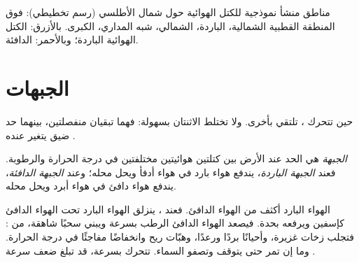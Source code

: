 \begin{omfigure}
{\small مناطق منشأ نموذجية للكتل الهوائية حول شمال  الأطلسي (رسم
تخطيطي): فوق المنطقة القطبية الشمالية،  الباردة،  الشمالي،
 شبه المداري،  الكبرى. بالأزرق: الكتل الهوائية الباردة؛
وبالأحمر: الدافئة.}
\label{fig:g8:fronts-and-weather-maps:sources}
\end{omfigure}

\section{الجبهات}

حين تتحرك ، تلتقي بأخرى. ولا تختلط الاثنتان بسهولة: فهما تبقيان
منفصلتين، بينهما حد ضيق يتغير عنده .

\begin{definition}[الجبهة]\label{def:g8:fronts-and-weather-maps:front}
\emph{الجبهة} هي الحد عند الأرض بين كتلتين هوائيتين مختلفتين في
درجة الحرارة والرطوبة. فعند \emph{الجبهة الباردة}، يندفع
هواء بارد في هواء أدفأ ويحل محله؛ وعند \emph{الجبهة الدافئة}،
يندفع هواء دافئ في هواء أبرد ويحل محله.
\end{definition}

الهواء البارد أكثف من الهواء الدافئ. فعند ، ينزلق الهواء البارد
تحت الهواء الدافئ كإسفين ويرفعه بحدة. فيصعد الهواء الدافئ الرطب بسرعة ويبني
سحبًا شاهقة، من  : فتجلب  زخات غزيرة، وأحيانًا بردًا
ورعدًا، وهبّات ريح وانخفاضًا مفاجئًا في درجة الحرارة. وما إن تمر حتى يتوقف
 وتصفو السماء.  تتحرك بسرعة، قد تبلغ ضعف سرعة .

